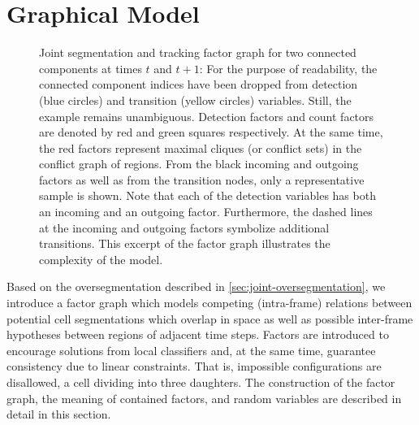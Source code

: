 \section{Graphical Model}
\label{sec:joint-graphical-model}
\begin{figure}
\begin{center}
    \begin{tikzpicture}[auto, thick, on grid,scale=1.8,every node/.style={scale=1.5, thick}]
        
    \end{tikzpicture}
\end{center}
\caption[Joint segmentation and tracking factor graph for two connected components.]{Joint
    segmentation and tracking factor graph for two connected components at times $t$ and $t+1$: For
    the purpose of readability, the connected component indices have been dropped from detection
    (blue circles) and transition (yellow circles) variables. Still, the example remains
    unambiguous. Detection factors and count factors are denoted by red and green squares
    respectively. At the same time, the red factors represent maximal cliques (or conflict sets) in
    the conflict graph of regions.  From the black incoming and outgoing factors as well as from the
    transition nodes, only a representative sample is shown. Note that each of the detection
    variables has both an incoming and an outgoing factor. Furthermore, the dashed lines at the
    incoming and outgoing factors symbolize additional transitions. This excerpt of the factor graph
    illustrates the complexity of the model.}
\label{fig:joint-factor_graph}
\end{figure}

Based on the oversegmentation described in \cref{sec:joint-oversegmentation},
we introduce a factor graph which models competing (intra-frame)
relations between potential cell segmentations which overlap in
space %
as well as possible inter-frame hypotheses between regions of adjacent time steps. Factors are
introduced to encourage solutions from local classifiers and, at the same time, guarantee
consistency due to
linear constraints. That is, impossible configurations are disallowed, \eg a
cell dividing into three daughters. %
The construction of the factor graph, the meaning of contained factors, and random variables are
described in detail in this section.

